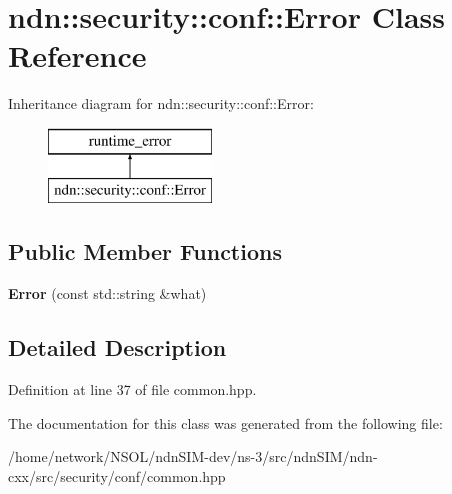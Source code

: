 \hypertarget{classndn_1_1security_1_1conf_1_1Error}{}\section{ndn\+:\+:security\+:\+:conf\+:\+:Error Class Reference}
\label{classndn_1_1security_1_1conf_1_1Error}
Inheritance diagram for ndn\+:\+:security\+:\+:conf\+:\+:Error\+:\begin{figure}[H]
\begin{center}
\leavevmode
\includegraphics[height=2.000000cm]{classndn_1_1security_1_1conf_1_1Error}
\end{center}
\end{figure}
\subsection*{Public Member Functions}
\begin{DoxyCompactItemize}
\item 
{\bfseries Error} (const std\+::string \&what)\hypertarget{classndn_1_1security_1_1conf_1_1Error_a4fbcc03ff95a8d70dedbf9294cd009a0}{}\label{classndn_1_1security_1_1conf_1_1Error_a4fbcc03ff95a8d70dedbf9294cd009a0}

\end{DoxyCompactItemize}


\subsection{Detailed Description}


Definition at line 37 of file common.\+hpp.



The documentation for this class was generated from the following file\+:\begin{DoxyCompactItemize}
\item 
/home/network/\+N\+S\+O\+L/ndn\+S\+I\+M-\/dev/ns-\/3/src/ndn\+S\+I\+M/ndn-\/cxx/src/security/conf/common.\+hpp\end{DoxyCompactItemize}
